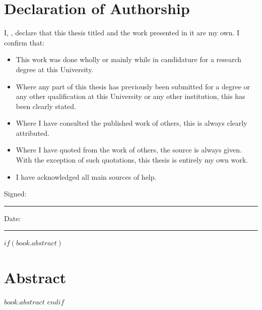 
\clearpage
\chapter*{Declaration of Authorship}

\vspace*{\fill}

\noindent I, \authorname, declare that this thesis titled \textit{\ttitle} and the work presented in it are my own. I confirm that:

\begin{itemize}
  \item This work was done wholly or mainly while in candidature for a research degree at this University.
  \item Where any part of this thesis has previously been submitted for a degree or any other qualification at this University or any other institution, this has been clearly stated.
  \item Where I have consulted the published work of others, this is always clearly attributed.
  \item Where I have quoted from the work of others, the source is always given. With the exception of such quotations, this thesis is entirely my own work.
  \item I have acknowledged all main sources of help.
\end{itemize}

\vspace{2cm}
\noindent Signed:\quad\rule[0.5em]{20em}{0.5pt}

\vspace{0.5cm}
\noindent Date:\quad\rule[0.5em]{20em}{0.5pt}

\vspace*{\fill}


$if(book.abstract)$
\clearpage
\chapter*{Abstract}
$book.abstract$
$endif$

